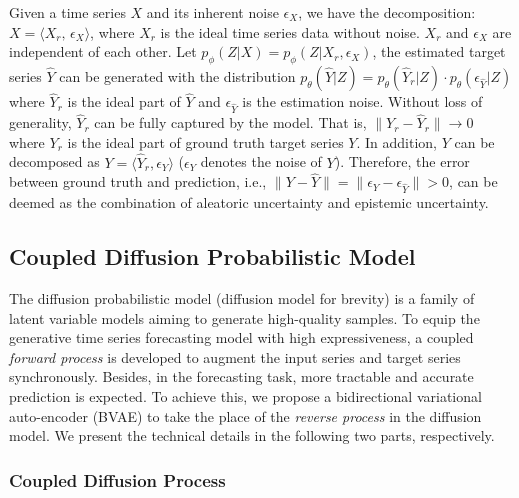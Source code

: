 \begin{prop} \label{prop1}
Given a time series $X$ and its inherent noise  $\epsilon_X$,  we have the  decomposition: $X = \langle X_{r}, \, \epsilon_X \rangle $, where $X_r$ is the ideal time series data without noise. 
$ X_{r}$ and $\epsilon_X $ are independent of each other. 
Let $p_{\phi} (Z|X) = p_{\phi} (Z| X_{r} , \epsilon_X) $,
the estimated target series $\widehat{Y}$  can be generated with the distribution $p_{\theta} (\widehat{Y}|Z) = p_{\theta} (\widehat{Y}_r|Z) \cdot p_{\theta} (\epsilon_{\widehat{Y}}|Z)$ where $ \widehat{Y}_r $ is the ideal part of $ \widehat{Y} $ and $ \epsilon_{\widehat{Y}} $ is the estimation noise. 
Without loss of generality, $ \widehat{Y}_r $ can be fully captured by the model.
That is,  $ \| Y_r - \widehat{Y}_r \| \longrightarrow 0 $ where $Y_r$ is the ideal part of ground truth target series $Y$.
In addition, $Y$ can be decomposed as $Y = \langle \widehat{Y}_r , \epsilon_Y \rangle$ ($\epsilon_Y$ denotes the noise of $Y$). 
Therefore, the error between ground truth and prediction, i.e., $ \| Y - \widehat{Y} \| = \| \epsilon_Y - \epsilon_{\widehat{Y}} \| > 0$, 
can be deemed as the combination of aleatoric uncertainty and epistemic uncertainty.
\end{prop}

\subsection{Coupled Diffusion Probabilistic Model} \label{sec2.2}

The diffusion probabilistic model (diffusion model for brevity) is a family of latent variable models aiming to generate high-quality samples. 
To equip the generative time series forecasting model with high expressiveness, a coupled {\em forward process} is developed to augment the input series and target series synchronously. 
Besides, in the forecasting task, more tractable and accurate prediction is expected. 
To achieve this, we propose a bidirectional variational auto-encoder (BVAE) to take the place of the {\em reverse process} in the diffusion model. 
We present the technical details in the following two parts, respectively. 

\subsubsection{Coupled Diffusion Process}


